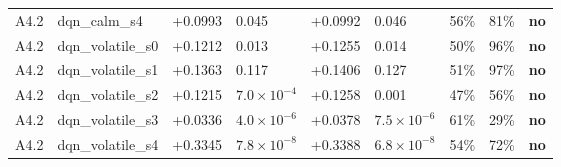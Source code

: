 \begin{table}[htbp]
\begin{tabular}{llrlrlrrl}
A4.2 & dqn\_calm\_s4 & +0.0993 & 0.045 & +0.0992 & 0.046 & 56\% & 81\% & \textbf{no} \\
A4.2 & dqn\_volatile\_s0 & +0.1212 & 0.013 & +0.1255 & 0.014 & 50\% & 96\% & \textbf{no} \\
A4.2 & dqn\_volatile\_s1 & +0.1363 & 0.117 & +0.1406 & 0.127 & 51\% & 97\% & \textbf{no} \\
A4.2 & dqn\_volatile\_s2 & +0.1215 & $7.0\times 10^{-4}$ & +0.1258 & 0.001 & 47\% & 56\% & \textbf{no} \\
A4.2 & dqn\_volatile\_s3 & +0.0336 & $4.0\times 10^{-6}$ & +0.0378 & $7.5\times 10^{-6}$ & 61\% & 29\% & \textbf{no} \\
A4.2 & dqn\_volatile\_s4 & +0.3345 & $7.8\times 10^{-8}$ & +0.3388 & $6.8\times 10^{-8}$ & 54\% & 72\% & \textbf{no} \\
\bottomrule
\end{tabular}
\end{table}
